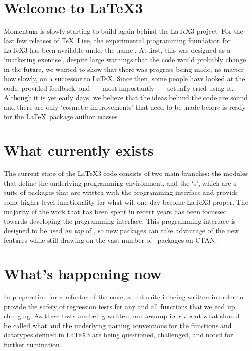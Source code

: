 \documentclass{ltnews}
\begin{document}
\maketitle

\section{Welcome to \LaTeX3}

Momentum is slowly starting to build again behind the \LaTeX3 project. For the
last few releases of \TeX~Live, the experimental programming foundation for
\LaTeX3 has been available under the name . At first, this was
designed as a `marketing exercise', despite large warnings that the code would
probably change in the future, we wanted to show that there was progress being
made, no matter how slowly, on a successor to \LaTeX. Since then, some people
have looked at the code, provided feedback, and~--- most importantly~---
actually tried using it. Although it is yet early days, we believe that the
ideas behind the code are sound and there are only `cosmetic improvements'
that need to be made before  is ready for the \LaTeX~package
author masses.

\section{What currently exists}

The current state of the \LaTeX3 code consists of two main branches: the
 modules that define the underlying programming environment,
and the `s', which are a suite of packages that are written
with the  programming interface and provide some higher-level
functionality for what will one day become \LaTeX3 proper. The majority of the
work that has been spent in recent years has been focussed towards developing
the  programming interface. This programming interface is
designed to be used \emph{on top} of \LaTeXe, so new packages can take
advantage of the new features while still drawing on the vast number of
\LaTeXe\ packages on CTAN.

\section{What's happening now}

In preparation for a refactor of the  code, a test suite is
being written in order to provide the safety of regression tests for any and
all functions that we end up changing. As these tests are being written, our
assumptions about what should be called what and the underlying naming
conventions for the functions and datatypes defined in \LaTeX3 are being
questioned, challenged, and noted for further rumination.
\end{document}
